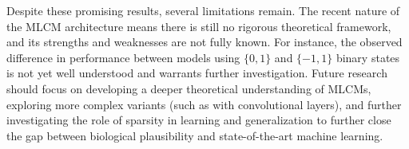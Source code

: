 \documentclass[a4paper,12pt]{report}
\begin{document}
Despite these promising results, several limitations remain. The recent nature of 
the MLCM architecture means there is still no rigorous theoretical framework, and 
its strengths and weaknesses are not fully known. For instance, the observed difference in performance between models 
using \(\{0,1\}\) and \(\{-1,1\}\) binary states is not yet well understood and 
warrants further investigation. Future research should focus on developing a deeper 
theoretical understanding of MLCMs, exploring more complex variants 
(such as with convolutional layers), and further investigating the role of sparsity in 
learning and generalization to further close the gap between biological plausibility 
and state-of-the-art machine learning.





\appendix
\end{document}
